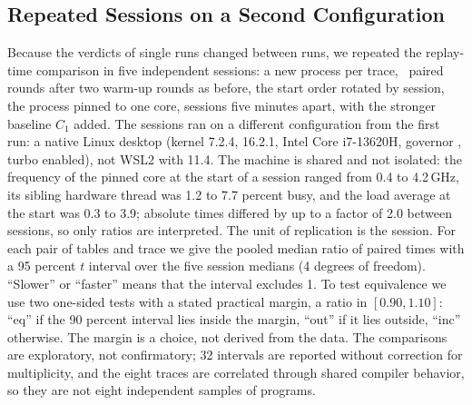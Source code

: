 \subsection{Repeated Sessions on a Second Configuration}
\label{sec:sessions}
Because the verdicts of single runs changed between runs, we repeated the replay-time comparison in five independent sessions: a new process per trace, \Rounds\ paired rounds after two warm-up rounds as before, the start order rotated by session, the process pinned to one core, sessions five minutes apart, with the stronger baseline $C_1$ added. The sessions ran on a different configuration from the first run: a native Linux desktop (kernel 7.2.4,  16.2.1, Intel Core i7-13620H,  governor , turbo enabled), not WSL2 with  11.4. The machine is shared and not isolated: the frequency of the pinned core at the start of a session ranged from 0.4 to 4.2\,GHz, its sibling hardware thread was 1.2 to 7.7 percent busy, and the load average at the start was 0.3 to 3.9; absolute times differed by up to a factor of 2.0 between sessions, so only ratios are interpreted. The unit of replication is the session. For each pair of tables and trace we give the pooled median ratio of paired times with a 95 percent $t$ interval over the five session medians (4 degrees of freedom). ``Slower'' or ``faster'' means that the interval excludes 1. To test equivalence we use two one-sided tests with a stated practical margin, a ratio in $[0.90,1.10]$: ``eq'' if the 90 percent interval lies inside the margin, ``out'' if it lies outside, ``inc'' otherwise. The margin is a choice, not derived from the data. The comparisons are exploratory, not confirmatory; 32 intervals are reported without correction for multiplicity, and the eight traces are correlated through shared compiler behavior, so they are not eight independent samples of programs.

\begin{table}[t!]
\label{tab:sessions}
\centering
\setlength{\tabcolsep}{2.4pt}
\end{table}


